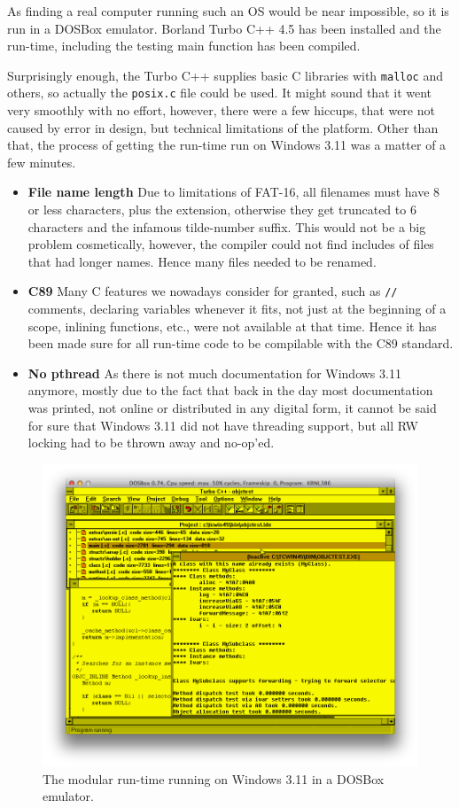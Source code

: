 As finding a real computer running such an OS would be near impossible, so it is run in a DOSBox emulator. Borland Turbo C++ 4.5 has been installed and the run-time, including the testing main function has been compiled.

Surprisingly enough, the Turbo C++ supplies basic C libraries with \verb=malloc= and others, so actually the \verb=posix.c= file could be used. It might sound that it went very smoothly with no effort, however, there were a few hiccups, that were not caused by error in design, but technical limitations of the platform. Other than that, the process of getting the run-time run on Windows 3.11 was a matter of a few minutes.

\begin{itemize}
  \item{\bf{File name length}} Due to limitations of FAT-16, all filenames must have 8 or less characters, plus the extension, otherwise they get truncated to 6 characters and the infamous tilde-number suffix. This would not be a big problem cosmetically, however, the compiler could not find includes of files that had longer names. Hence many files needed to be renamed.
  \item{\bf{C89}} Many C features we nowadays consider for granted, such as \verb=//= comments, declaring variables whenever it fits, not just at the beginning of a scope, inlining functions, etc., were not available at that time. Hence it has been made sure for all run-time code to be compilable with the C89 standard.
  \item{\bf{No pthread}} As there is not much documentation for Windows 3.11 anymore, mostly due to the fact that back in the day most documentation was printed, not online or distributed in any digital form, it cannot be said for sure that Windows 3.11 did not have threading support, but all RW locking had to be thrown away and no-op'ed. 
\end{itemize}

\begin{figure}[H]
  \includegraphics[width=\textwidth]{img/dos_box_3_11.png}
  
  \centering{}
  \caption{The modular run-time running on Windows 3.11 in a DOSBox emulator.}
  \label{fig:win_3_11}
\end{figure}


